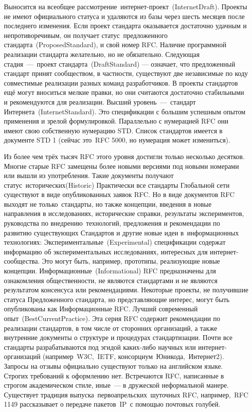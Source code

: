 Выносится на всеобщее рассмотрение интернет-проект (InternetDraft).
Проекты не имеют официального статуса и удаляются из базы через шесть
месяцев после последнего изменения.
Если проект стандарта оказывается достаточно удачным и непротиворечивым,
он получает статус предложенного стандарта (ProposedStandard), и свой номер RFC.
Наличие программной реализации стандарта желательно, но не обязательно.
Следующая стадия --- проект стандарта (DraftStandard) --- означает, что предложенный
стандарт принят сообществом, в частности, существуют две независимые по коду
совместимые реализации разных команд разработчиков. В проекты стандартов
ещё могут вноситься мелкие правки, но они считаются достаточно стабильными и рекомендуются для реализации.
Высший уровень --- стандарт Интернета (InternetStandard). Это спецификации
с большим успешным опытом применения и зрелой формулировкой. Параллельно с нумерацией RFC
они имеют свою собственную нумерацию STD. Список стандартов имеется в
документе STD 1 (сейчас это RFC 5000, но нумерация может измениться).

Из более чем трёх тысяч RFC этого уровня достигли только несколько десятков.
Многие старые RFC замещены более новыми версиями под новыми
номерами или вышли из употребления. Такие документы получают статус исторических(Historic)
Практически все стандарты Глобальной сети существуют в виде опубликованных заявок RFC.
Но в виде документов RFC выходят не только стандарты, но также концепции,
введения в новые направления в исследованиях, исторические справки, результаты экспериментов,
руководства по внедрению технологий, предложения и рекомендации по развитию
существующих Стандартов и другие новые идеи в информационных технологиях:
Экспериментальные (Experimental) спецификации содержат информацию об
экспериментальных исследованиях, интересных для интернет-сообщества.
Это могут быть, например, прототипы, реализующие новые концепции.
Информационные (Informational) RFC предназначены для ознакомления общественности,
не являются стандартами и не являются результатом консенсуса или рекомендациями.
Некоторые проекты, не получившие статуса Предложенного стандарта, но представляющие интерес,
могут быть опубликованы как Информационные RFC.
Лучший современный опыт (BestCurrentPractice). Эта серия RFC содержит рекомендации
по реализации стандартов, в том числе от сторонних организаций,
а также внутренние документы о структуре и процедурах стандартизации.
Почти все стандарты разрабатываются под эгидой каких-либо научных или
интернет-организаций (например W3C, IETF, консорциум Юникода, Интернет2).
Запросы на отзывы официально существуют только на английском языке.
Строгих требований к оформлению нет. Встречаются RFC, написанные
в строгом академическом стиле, иные --- в дружеской неформальной манере.
Существует традиция выпуска первоапрельских шуточных RFC, например, RFC 1149
рассказывает о передаче пакетов IP с помощью почтовых голубей.

